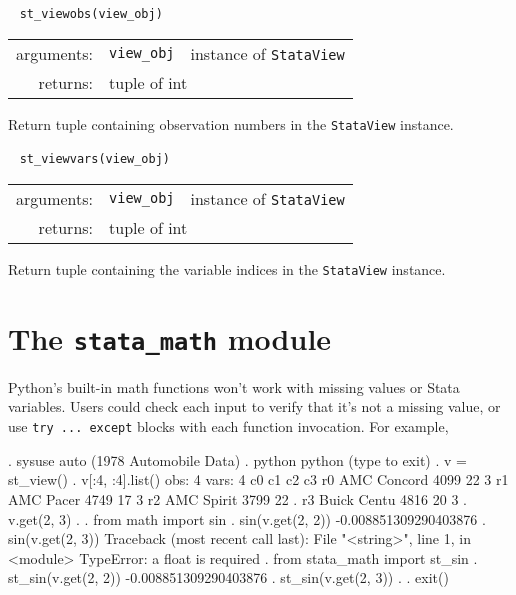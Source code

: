 \documentclass{article}
\begin{document}
			
			\ \newline
			\noindent \lstinline$st_viewobs(view_obj)$
								
			\vspace{1.5mm}
			\noindent 
			\indent \begin{tabular}{rrl}
				arguments: & \texttt{view\_obj} & instance of \lstinline$StataView$ \\
					returns: & \multicolumn{2}{l}{tuple of int}
				\end{tabular}
								
			\vspace{1.5mm}
			\noindent Return tuple containing observation numbers in the \lstinline$StataView$ instance. \newline
			
			
			\ \newline
			\noindent \lstinline$st_viewvars(view_obj)$
								
			\vspace{1.5mm}
			\noindent 
			\indent \begin{tabular}{rrl}
				arguments: & \texttt{view\_obj} & instance of \lstinline$StataView$ \\
					returns: & \multicolumn{2}{l}{tuple of int}
				\end{tabular}
								
			\vspace{1.5mm}
			\noindent Return tuple containing the variable indices in the \lstinline$StataView$ instance. \newline
  
	
\section{The \lstinline$stata_math$ module} \label{stata_math_module}

Python's built-in math functions won't work with missing values or Stata variables. Users could check each input to verify that it's not a missing value, or use \lstinline{try ... except} blocks with each function invocation. For example,

\begin{stlog}
{\smallskip}
. sysuse auto
(1978 Automobile Data)
{\smallskip}
. python
 python (type {} to exit) 
{\bftt{>>>}}. v = st_view()
{\smallskip}
{\bftt{>>>}}. v[:4, :4].list()
{\smallskip}
  obs: 4
 vars: 4
{\smallskip}
            c0        c1        c2        c3
r0 AMC Concord      4099        22         3
r1   AMC Pacer      4749        17         3
r2  AMC Spirit      3799        22         .
r3 Buick Centu      4816        20         3
{\smallskip}
{\bftt{>>>}}. v.get(2, 3)
.
{\smallskip}
{\bftt{>>>}}. from math import sin
{\smallskip}
{\bftt{>>>}}. sin(v.get(2, 2))
-0.008851309290403876
{\smallskip}
{\bftt{>>>}}. sin(v.get(2, 3))
{\color{red}Traceback (most recent call last):
  File "<string>", line 1, in <module>
TypeError: a float is required}
{\smallskip}
{\bftt{>>>}}. from stata_math import st_sin
{\smallskip}
{\bftt{>>>}}. st_sin(v.get(2, 2))
-0.008851309290403876
{\smallskip}
{\bftt{>>>}}. st_sin(v.get(2, 3))
.
{\smallskip}
{\bftt{>>>}}. exit()
\end{stlog}
\end{document}
